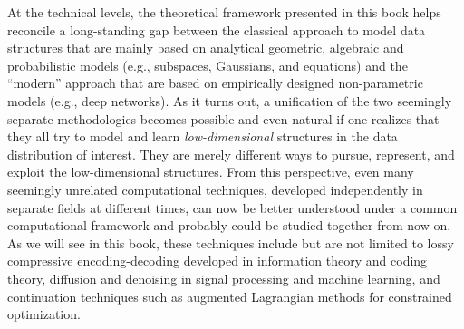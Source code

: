 \documentclass[../../book-main.tex]{subfiles}
\begin{document}
At the technical levels, the theoretical framework presented in this book helps reconcile a long-standing gap between the classical approach to model data structures that are mainly based on analytical geometric, algebraic and probabilistic models (e.g., subspaces, Gaussians, and equations) and the ``modern'' approach that are based on empirically designed non-parametric models (e.g., deep networks). As it turns out, a unification of the two seemingly separate methodologies becomes possible and even natural if one realizes that they all try to model and learn {\em low-dimensional} structures in the data distribution of interest. They are merely different ways to pursue, represent, and exploit the low-dimensional structures. From this perspective, even many seemingly unrelated computational techniques, developed independently in separate fields at different times, can now be better understood under a common computational framework and probably could be studied together from now on. As we will see in this book, these techniques include but are not limited to lossy compressive encoding-decoding developed in information theory and coding theory, diffusion and denoising in signal processing and machine learning, and continuation techniques such as augmented Lagrangian methods for constrained optimization. 
\end{document}
